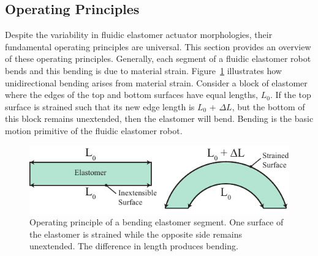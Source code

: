 \subsection{Operating Principles}
\label{subsec:Actuators, Operating Principles}
Despite the variability in fluidic elastomer actuator morphologies, their fundamental operating principles are universal.
This section provides an overview of these operating principles.
Generally, each segment of a fluidic elastomer robot bends and this bending is due to material strain.
Figure~\ref{fig:ElastomerBending} illustrates how unidirectional bending arises from material strain.
Consider a block of elastomer where the edges of the top and bottom surfaces have equal lengths, $L_0$.
If the top surface is strained such that its new edge length is $L_0$ + $\Delta L$, but the bottom of this block remains unextended, then the elastomer will bend.
Bending is the basic motion primitive of the fluidic elastomer robot.
\begin{figure}[htb]
\centering
\includegraphics[width=0.85\columnwidth]{figures/actuators/ElastomerBending}
\caption[Operating principle of a bending elastomer segment.]{Operating principle of a bending elastomer segment. One surface of the elastomer is strained while the opposite side remains unextended. The difference in length produces bending.}
\label{fig:ElastomerBending}
\end{figure}

